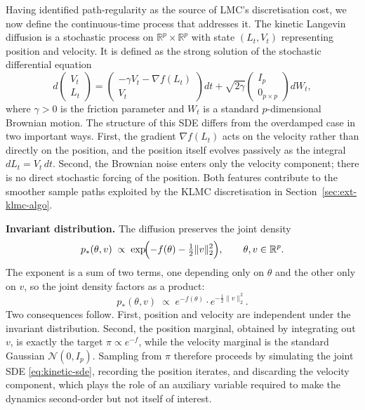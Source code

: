 \documentclass[a4paper,11pt, titlepage]{article}
\theoremstyle{definition}
\theoremstyle{plain}
\theoremstyle{remark}
\begin{document}
Having identified path-regularity as the source of LMC's discretisation cost, we now define the continuous-time process that addresses it. The kinetic Langevin diffusion is a stochastic process on $\mathbb{R}^p \times \mathbb{R}^p$ with state $(L_t, V_t)$ representing position and velocity. It is defined as the strong solution of the stochastic differential equation
\begin{equation}
d\!\begin{pmatrix} V_t \\ L_t \end{pmatrix}
=
\begin{pmatrix} -\gamma V_t - \nabla f(L_t) \\ V_t \end{pmatrix} dt
+
\sqrt{2\gamma}\begin{pmatrix} I_p \\ 0_{p\times p} \end{pmatrix} dW_t,
\label{eq:kinetic-sde}
\end{equation}
where $\gamma > 0$ is the friction parameter and $W_t$ is a standard $p$-dimensional Brownian motion. The structure of this SDE differs from the overdamped case in two important ways. First, the gradient $\nabla f(L_t)$ acts on the velocity rather than directly on the position, and the position itself evolves passively as the integral $dL_t = V_t\,dt$. Second, the Brownian noise enters only the velocity component; there is no direct stochastic forcing of the position. Both features contribute to the smoother sample paths exploited by the KLMC discretisation in Section~\ref{sec:ext-klmc-algo}.

\textbf{Invariant distribution.} The diffusion preserves the joint density
\begin{equation}
p_*(\theta, v)
\;\propto\;
\exp\!\Bigl(-f(\theta) - \tfrac{1}{2}\|v\|_2^2\Bigr),
\qquad \theta, v \in \mathbb{R}^p.
\label{eq:kinetic-invariant}
\end{equation}
The exponent is a sum of two terms, one depending only on $\theta$ and the
other only on $v$, so the joint density factors as a product:
\[
p_*(\theta, v) \;\propto\; e^{-f(\theta)} \cdot e^{-\tfrac{1}{2}\|v\|_2^2}.
\]
Two consequences follow. First, position and velocity are independent under
the invariant distribution. Second, the position marginal, obtained by
integrating out $v$, is exactly the target $\pi \propto e^{-f}$, while the
velocity marginal is the standard Gaussian $\mathcal{N}(0, I_p)$. Sampling
from $\pi$ therefore proceeds by simulating the joint SDE \eqref{eq:kinetic-sde},
recording the position iterates, and discarding the velocity component, which
plays the role of an auxiliary variable required to make the dynamics
second-order but not itself of interest.
\end{document}
